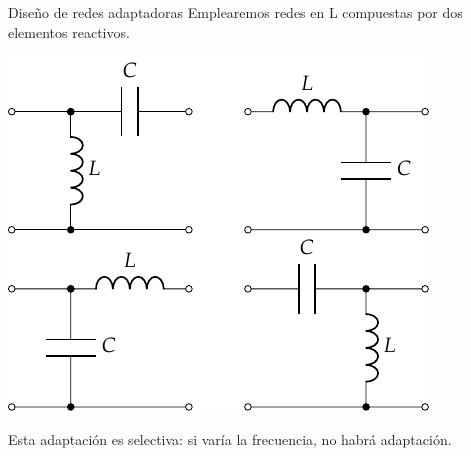\documentclass[aspectratio=169, usenames,svgnames,dvipsnames]{beamer}
\begin{document}
\begin{frame}[label={sec:org6064644}]{Diseño de redes adaptadoras}
Emplearemos redes en L compuestas por dos elementos reactivos.

\begin{center}
\includegraphics[height=0.7\textheight]{../figs/Everitt_LC.pdf}
\end{center}

Esta adaptación es selectiva: si varía la frecuencia, no habrá adaptación.
\end{frame}
\end{document}
